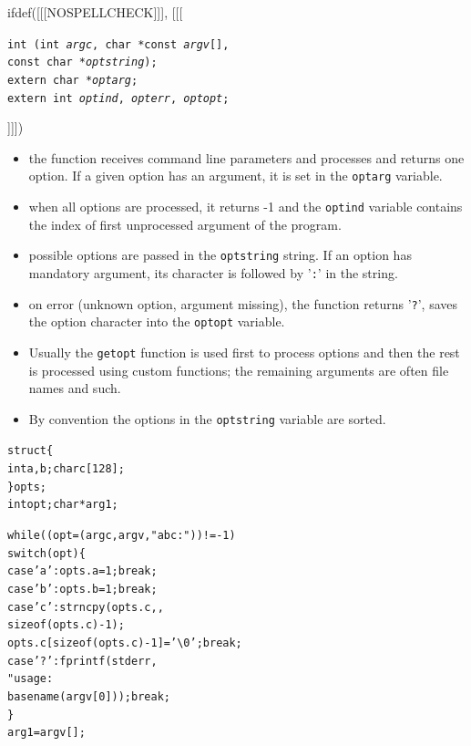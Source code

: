 \begin{slide}
\setlength{\baselineskip}{0.8\baselineskip}
ifdef([[[NOSPELLCHECK]]], [[[
\begin{tabbing}
\texttt{int (}\=\texttt{int \emph{argc},
char *const \emph{argv}[],}\\
\>\texttt{const char *\emph{optstring});}\\
\texttt{extern char *\emph{optarg};}\\
\texttt{extern int \emph{optind}, \emph{opterr}, \emph{optopt};}
\end{tabbing}
]]])
\begin{itemize}
\item the function receives command line parameters and processes and returns
one option. If a given option has an argument, it is set in the
\texttt{optarg} variable.
\item when all options are processed, it returns -1 and the \texttt{optind}
variable contains the index of first unprocessed argument of the program.
\item possible options are passed in the \texttt{optstring} string.
If an option has mandatory argument, its character is followed by '\texttt{:}'
in the string.
\item on error (unknown option, argument missing), the function returns
'\texttt{?}', saves the option character into the \texttt{optopt} variable.
\end{itemize}
\end{slide}

\begin{itemize}
\item Usually the \texttt{getopt} function is used first to process options
and then the rest is processed using custom functions; the remaining arguments
are often file names and such.
\item By convention the options in the \texttt{optstring} variable are sorted.
\end{itemize}


\begin{slide}
\setlength{\baselineskip}{0.8\baselineskip}
\begin{alltt}
struct \{
    int a, b; char c[128]; 
\} opts; 
int opt; char *arg1; 

while((opt = (argc, argv, "abc:")) != -1) 
    switch(opt) \{ 
        case 'a': opts.a = 1; break; 
        case 'b': opts.b = 1; break; 
        case 'c': strncpy(opts.c, ,
            sizeof (opts.c) - 1);
            opts.c[sizeof (opts.c) - 1] = '\textbackslash0'; break; 
        case '?': fprintf(stderr, 
            "usage: %
            basename(argv[0])); break; 
    \} 
arg1 = argv[];
\end{alltt}
\end{slide}

